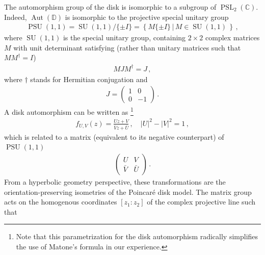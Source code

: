 \documentclass[aps,pre,reprint,longbibliography,superscriptaddress,noshowpacs,floatfix]{revtex4-2}
\theoremstyle{definition}
\theoremstyle{remark}
\DeclareMathOperator{\PSL}{PSL}
\DeclareMathOperator{\SU}{SU}
\DeclareMathOperator{\PSU}{PSU}
\DeclareMathOperator{\Aut}{Aut}
\begin{document}
The automorphism group of the disk is isomorphic to a subgroup of $\PSL_2(\mathbb{C})$. Indeed, $\Aut(\mathbb{D})$ is isomorphic to the projective special unitary group
\begin{align*}
    \PSU(1, 1) = \SU(1, 1)/\{\pm I\} = \left\{ M\{\pm I\}\,|\,M \in \SU(1,1) \,\right\}\,,
\end{align*}
where $\SU(1, 1)$ is the special unitary group, containing $2 \times 2$ complex matrices $M$ with unit determinant satisfying (rather than unitary matrices such that $MM^{\dagger} = I$)
\begin{align}\label{eq:special_unitaire}
    MJM^\dagger = J\,,
\end{align}
where $\dagger$ stands for Hermitian conjugation and 
\begin{align*}
    J = \begin{pmatrix}
        1&0\\0&-1
    \end{pmatrix}\,.
\end{align*}
A disk automorphism can be written as \footnote{Note that this parametrization for the disk automorphism radically simplifies the use of Matone's formula in our experience.}
\begin{align}\label{eq:automorphisme_disque_UV_tz}
    f_{U, V}(z) = \frac{Uz + V}{\overline{V}z + \overline{U}}\,,\quad |U|^2 - |V|^2 = 1\,,
\end{align} 
which is related to a matrix (equivalent to its negative counterpart) of $\PSU(1, 1)$
\begin{align*}
    \begin{pmatrix}U&V\\\bar{V}&\bar{U}\end{pmatrix}
    \,.
\end{align*}
From a hyperbolic geometry perspective, these transformations are the orientation-preserving isometries of the Poincaré disk model. 
The matrix group acts on the homogenous coordinates $[z_1:z_2]$ of the complex projective line such that%
\end{document}
